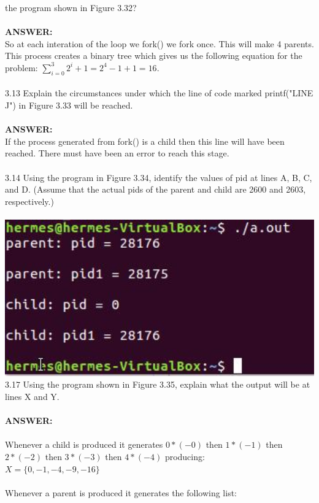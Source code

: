 \documentclass[12pt]{article}
\begin{document}
the program shown in Figure 3.32?\\\\
\textbf{ANSWER: }\\
So at each interation of the loop we fork() we fork once. This will make 4
parents. This process creates a binary tree which gives us the following 
equation for the problem: $\sum\limits_{i=0}^{3}{2^i} + 1=2^4-1 + 1=16$. \\\\
3.13 Explain the circumstances under which the line of code marked
printf("LINE J") in Figure 3.33 will be reached.\\\\
\textbf{ANSWER: }\\
If the process generated from fork() is a child then this line will have been 
reached. There must have been an error to reach this stage.\\\\
3.14 Using the program in Figure 3.34, identify the values of pid at lines A, B,
C, and D. (Assume that the actual pids of the parent and child are 2600
and 2603, respectively.)\\\\
\includegraphics[width=1\textwidth]{q_pi.jpg}\\
3.17 Using the program shown in Figure 3.35, explain what the output will
be at lines X and Y.\\\\
\textbf{ANSWER: }\\\\
Whenever a child is produced it generates $0*(-0)$ then $1*(-1)$ then $2*(-2)$ 
then $3*(-3)$ then $4*(-4)$ producing:\\ 
$X = \{0, -1, -4, -9, -16\}$\\\\
Whenever a parent is produced it generates the following list:\\
\end{document}
